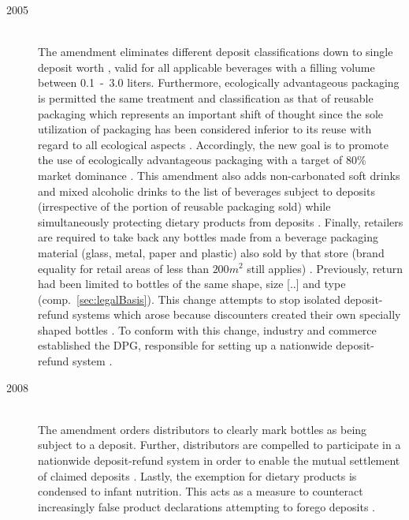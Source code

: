\begin{description}
	\item[2005]\label{itm:2005amendment}
	\hfill \\
	The amendment eliminates different deposit classifications down to single deposit worth , valid for all applicable beverages with a filling volume between 0.1~-~3.0 liters. Furthermore, \gls{ecologically advantageous packaging} is permitted the same treatment and classification as that of reusable packaging which represents an important shift of thought since the sole utilization of packaging has been considered inferior to its reuse with regard to all ecological aspects  \cite[p.~7]{Hartlep2011Recycling}. Accordingly, the new goal is to promote the use of ecologically advantageous packaging with a target of 80\% market dominance \cite[§~1]{verpackV2008}. This amendment also adds non-carbonated soft drinks and mixed alcoholic drinks to the list of beverages subject to deposits (irrespective of the portion of reusable packaging sold) while simultaneously protecting dietary products from deposits \cite[p.~1408]{verpackV2005} \cite[p.~171]{Flanderka/Stroetmann2009}. Finally, retailers are required to take back any bottles made from a beverage packaging material (glass, metal, paper and plastic) also sold by that store (brand equality for retail areas of less than $200m^2$ still applies)  \cite[p.~11]{Hartlep2011Recycling}. Previously, return had been limited to bottles of the same shape, size [..] and type (comp.~\ref{sec:legalBasis}). This change attempts to stop isolated deposit-refund systems which arose because discounters created their own specially shaped bottles \cite[p.~168]{Flanderka/Stroetmann2009}. To conform with this change, industry and commerce established the \acl{DPG}, responsible for setting up a nationwide deposit-refund system  \cite[p.~8]{Hartlep2011Recycling}.
	
	\item[2008]
	\hfill \\
	The amendment orders distributors to clearly mark bottles as being subject to a deposit. Further, distributors are compelled to participate in a nationwide deposit-refund system in order to enable the mutual settlement of claimed deposits \cite[§~9]{verpackV2008}. Lastly, the exemption for dietary products is condensed to infant nutrition. This acts as a measure to counteract increasingly false product declarations attempting to forego deposits \cite[pp.~531]{verpackV2008} \cite[p.~171]{Flanderka/Stroetmann2009}.
\end{description}

